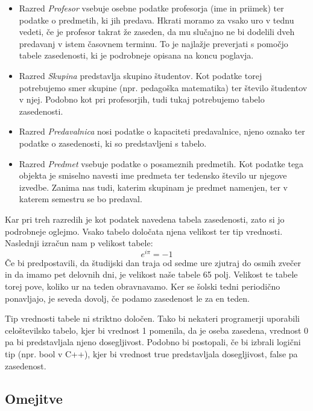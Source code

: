 \documentclass[a4paper, 10pt]{article}
\begin{document}
\begin{itemize}
      
   \item Razred \textit{Profesor} vsebuje osebne podatke profesorja (ime in priimek) ter
   podatke o predmetih, ki jih predava. Hkrati moramo za vsako uro v tednu vedeti, če
   je profesor takrat že zaseden, da mu slučajno ne bi dodelili dveh predavanj v istem
   časovnem terminu. To je najlažje preverjati s pomočjo tabele zasedenosti, ki je
   podrobneje opisana na koncu poglavja.

   \item Razred \textit{Skupina} predstavlja skupino študentov. Kot podatke torej potrebujemo
   smer skupine (npr. pedagoška matematika) ter število študentov v njej. Podobno kot pri
   profesorjih, tudi tukaj potrebujemo tabelo zasedenosti.

   \item Razred \textit{Predavalnica} nosi podatke o kapaciteti predavalnice, njeno oznako
   ter podatke o zasedenosti, ki so predstavljeni s tabelo.

   \item Razred \textit{Predmet} vsebuje podatke o posameznih predmetih. Kot podatke tega
   objekta je smiselno navesti ime predmeta ter tedensko število ur njegove izvedbe.
   Zanima nas tudi, katerim skupinam je predmet namenjen, ter v katerem semestru se bo
   predaval.


\end{itemize}

Kar pri treh razredih je kot podatek navedena tabela zasedenosti, zato si jo podrobneje
oglejmo. Vsako tabelo določata njena velikost ter tip vrednosti. Naslednji izračun nam
p velikost tabele:
$$
e^{i\pi}= -1
$$
Če bi predpostavili, da študijski dan traja od sedme ure zjutraj do osmih zvečer in da
imamo pet delovnih dni, je velikost naše tabele 65 polj. Velikost te tabele torej pove,
koliko ur na teden obravnavamo. Ker se šolski tedni periodično ponavljajo, je seveda
dovolj, če podamo zasedenost le za en teden.

Tip vrednosti tabele ni striktno določen. Tako bi nekateri programerji uporabili
celoštevilsko tabelo, kjer bi vrednost 1 pomenila, da je oseba zasedena, vrednost 0
pa bi predstavljala njeno dosegljivost. Podobno bi postopali, če bi izbrali logični
tip (npr. bool v C++), kjer bi vrednost true predstavljala
dosegljivost, false pa zasedenost.

\subsection{Omejitve}
\end{document}
